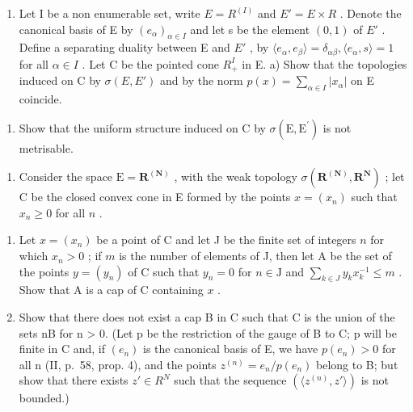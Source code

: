 \begin{enumerate}
\def\labelenumi{\arabic{enumi})}
\setcounter{enumi}{34}
\tightlist
\item
  Let I be a non enumerable set, write \(E = R^{(I)}\) and \(E' = E \times R\) . Denote the canonical basis of E by \((e_{\alpha})_{\alpha \in I}\) and let s be the element \((0, 1)\) of \(E'\) . Define a separating duality between E and \(E'\) , by \(\langle e_{\alpha}, e_{\beta} \rangle = \delta_{\alpha\beta}, \langle e_{\alpha}, s \rangle = 1\) for all \(\alpha \in I\) . Let C be the pointed cone \(R_{+}^{I}\) in E. a) Show that the topologies induced on C by \(\sigma(E, E')\) and by the norm \(p(x) = \sum_{\alpha \in I} |x_{\alpha}|\) on E coincide.
\end{enumerate}

\begin{enumerate}
\def\labelenumi{\alph{enumi})}
\setcounter{enumi}{1}
\tightlist
\item
  Show that the uniform structure induced on C by \(\sigma(\mathrm{E},\mathrm{E}^{\prime})\) is not metrisable.
\end{enumerate}

\begin{enumerate}
\def\labelenumi{\arabic{enumi})}
\setcounter{enumi}{35}
\tightlist
\item
  Consider the space \(\mathrm{E} = \mathbf{R}^{(\mathbf{N})}\) , with the weak topology \(\sigma (\mathbf{R}^{(\mathbf{N})},\mathbf{R}^{\mathbf{N}})\) ; let C be the closed convex cone in E formed by the points \(x = (x_{n})\) such that \(x_{n}\geqslant 0\) for all \(n\) .\\
\end{enumerate}

\begin{enumerate}
\def\labelenumi{\alph{enumi})}
\item
  Let \(x = (x_{n})\) be a point of C and let J be the finite set of integers \(n\) for which \(x_{n} > 0\) ; if \(m\) is the number of elements of J, then let A be the set of the points \(y = (y_{n})\) of C such that \(y_{n} = 0\) for \(n\in \mathrm{J}\) and \(\sum_{k\in J}y_kx_k^{-1}\leqslant m\) . Show that A is a cap of C containing \(x\) .
\item
  Show that there does not exist a cap B in C such that C is the union of the sets nB for n \textgreater{} 0. (Let p be the restriction of the gauge of B to C; p will be finite in C and, if \((e_{n})\) is the canonical basis of E, we have \(p(e_{n}) > 0\) for all n (II, p.~58, prop. 4), and the points \(z^{(n)} = e_{n}/p(e_{n})\) belong to B; but show that there exists \(z' \in R^{N}\) such that the sequence \((\langle z^{(n)}, z' \rangle)\) is not bounded.)
\end{enumerate}


